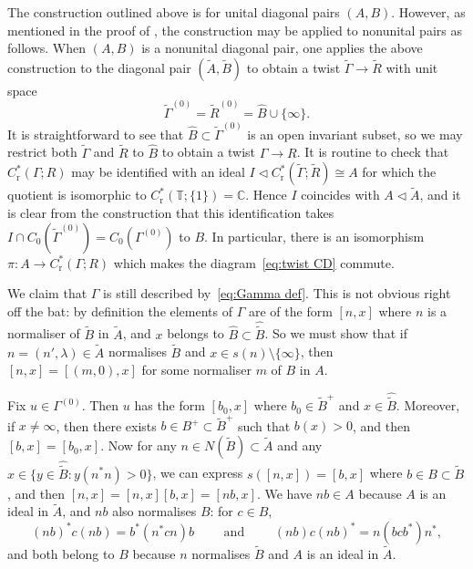 \documentclass[12pt,a4paper]{amsart}
\newcommand{\field}[1]{\mathbb{#1}}
\newcommand{\CC}{\field{C}}
\newcommand{\TT}{\field{T}}
\newcommand{\red}{\operatorname{r}}
\newcommand{\tgcsa}[2]{\ensuremath{C^*_{\red}(#1 ; #2)}}
\begin{document}
\begin{remark}\label{nonunital}
The construction outlined above is for unital diagonal pairs
$(A,B)$. However, as mentioned in the proof of
\cite[Theorem~3.1]{Kumjian1986}, the construction may be
applied to nonunital pairs as follows. When $(A,B)$ is a
nonunital diagonal pair, one applies the above construction to
the diagonal pair $(\widetilde{A}, \widetilde{B})$ to obtain a
twist $\widetilde{\Gamma} \to \widetilde{R}$ with unit space
\[
\widetilde{\Gamma}^{(0)}
    = \widetilde{R}^{(0)}
    = \widehat{B} \cup \{\infty\}.
\]
It is straightforward to see that $\widehat{B} \subset
\widetilde{\Gamma}^{(0)}$ is an open invariant subset, so we
may restrict both $\widetilde{\Gamma}$ and $\widetilde{R}$ to
$\widehat{B}$ to obtain a twist $\Gamma \to R$. It is routine
to check that $\tgcsa{\Gamma}{R}$ may be identified with an
ideal $I \lhd \tgcsa{\widetilde{\Gamma}}{ \widetilde{R}} \cong
A$ for which the quotient is isomorphic to $\tgcsa{\TT}{ \{1\}}
= \CC$. Hence $I$ coincides with $A \lhd \widetilde{A}$, and it
is clear from the construction that this identification takes
$I \cap C_0(\widetilde{\Gamma}^{(0)}) = C_0(\Gamma^{(0)})$ to
$B$. In particular, there is an isomorphism $\pi : A \to
\tgcsa{\Gamma}{R}$ which makes the diagram~\eqref{eq:twist CD}
commute.

We claim that $\Gamma$ is still described by~\eqref{eq:Gamma
def}. This is not obvious right off the bat: by definition the
elements of $\Gamma$ are of the form $[n,x]$ where $n$ is a
normaliser of $\widetilde{B}$ in $\widetilde{A}$, and $x$
belongs to $\widehat{B} \subset \widehat{\widetilde{B}}$. So we
must show that if $n = (n',\lambda) \in \widetilde{A}$
normalises $\widetilde{B}$ and $x \in s(n) \setminus
\{\infty\}$, then $[n,x] = [(m,0),x]$ for some normaliser $m$
of $B$ in $A$.

Fix $u \in \Gamma^{(0)}$. Then $u$ has the form $[b_0,x]$ where
$b_0 \in \widetilde{B}^+$ and $x \in \widehat{\widetilde{B}}$.
Moreover, if $x \not= \infty$, then there exists $b \in B^+
\subset \widetilde{B}^+$ such that $b(x) > 0$, and then $[b,x] =
[b_0,x]$. Now for any $n \in N(\widetilde{B}) \subset
\widetilde{A}$ and any $x \in
\{y\in\widehat{\widetilde{B}}:y(n^*n)>0\}$, we can express
$s([n,x]) = [b,x]$ where $b \in B \subset \widetilde{B}$, and
then $[n,x] = [n,x][b,x] = [nb, x]$. We have $nb \in A$ because
$A$ is an ideal in $\widetilde{A}$, and $nb$ also normalises
$B$: for $c \in B$,
\begin{equation}\label{eq:adjusting normalisers}
(nb)^* c (nb) = b^* (n^* c n) b\qquad\text{ and }\qquad
(nb) c (nb)^* = n (bcb^*) n^*,
\end{equation}
and both belong to $B$ because $n$ normalises $\widetilde{B}$
and $A$ is an ideal in $\widetilde{A}$.
\end{remark}
\end{document}
